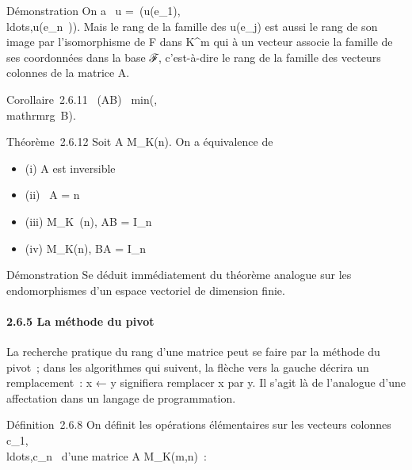 \documentclass[]{article}
\begin{document}
Démonstration On a
\mathrmrg~u
=\
\mathrmrg(u(e_1),\\ldots,u(e_n~)).
Mais le rang de la famille des u(e_j) est aussi le rang de son
image par l'isomorphisme de F dans K^m qui à un vecteur
associe la famille de ses coordonnées dans la base ℱ, c'est-à-dire le
rang de la famille des vecteurs colonnes de la matrice A.

Corollaire~2.6.11
\mathrmrg~(AB)
\leq\
min(\mathrmrgA,\\mathrmrg~B).

Théorème~2.6.12 Soit A \in M_K(n). On a équivalence de

\begin{itemize}
\itemsep1pt\parskip0pt
\item
  (i) A est inversible
\item
  (ii) \mathrmrg~A = n
\item
  (iii) \existsB \in M_K~(n), AB =
  I_n
\item
  (iv) \existsB \in M_K(n), BA = I_n~
\end{itemize}

Démonstration Se déduit immédiatement du théorème analogue sur les
endomorphismes d'un espace vectoriel de dimension finie.

\paragraph{2.6.5 La méthode du pivot}

La recherche pratique du rang d'une matrice peut se faire par la méthode
du pivot~; dans les algorithmes qui suivent, la flèche vers la gauche
décrira un remplacement~: x ← y signifiera remplacer x par y. Il s'agit
là de l'analogue d'une affectation dans un langage de programmation.

Définition~2.6.8 On définit les opérations élémentaires sur les vecteurs
colonnes
c_1,\\ldots,c_n~
d'une matrice A \in M_K(m,n)~:
\end{document}
